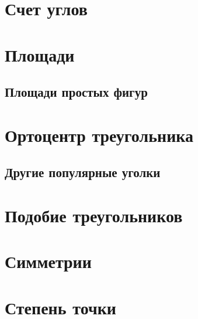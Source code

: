 \documentclass[twoside]{article}
\begin{document}
\pagestyle{empty}

% 


\newpage

\tableofcontents
\newpage

\setcounter{page}{1}
\pagestyle{fancy}


\section{Счет углов}


% 

\section{Площади}
\subsection{Площади простых фигур}

\section{Ортоцентр треугольника}


\subsection{Другие популярные уголки}


\section{Подобие треугольников}


\section{Симметрии}

\section{Степень точки}

\end{document}
